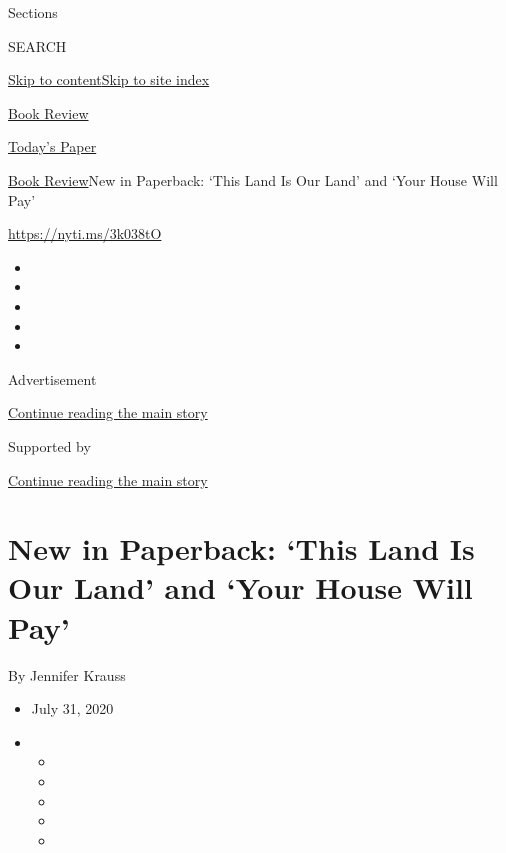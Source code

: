 Sections

SEARCH

\protect\hyperlink{site-content}{Skip to
content}\protect\hyperlink{site-index}{Skip to site index}

\href{https://www.nytimes.com/section/books/review}{Book Review}

\href{https://myaccount.nytimes.com/auth/login?response_type=cookie\&client_id=vi}{}

\href{https://www.nytimes.com/section/todayspaper}{Today's Paper}

\href{/section/books/review}{Book Review}\textbar{}New in Paperback:
`This Land Is Our Land' and `Your House Will Pay'

\url{https://nyti.ms/3k038tO}

\begin{itemize}
\item
\item
\item
\item
\item
\end{itemize}

Advertisement

\protect\hyperlink{after-top}{Continue reading the main story}

Supported by

\protect\hyperlink{after-sponsor}{Continue reading the main story}

\hypertarget{new-in-paperback-this-land-is-our-land-and-your-house-will-pay}{%
\section{New in Paperback: `This Land Is Our Land' and `Your House Will
Pay'}\label{new-in-paperback-this-land-is-our-land-and-your-house-will-pay}}

By Jennifer Krauss

\begin{itemize}
\item
  July 31, 2020
\item
  \begin{itemize}
  \item
  \item
  \item
  \item
  \item
  \end{itemize}
\end{itemize}


